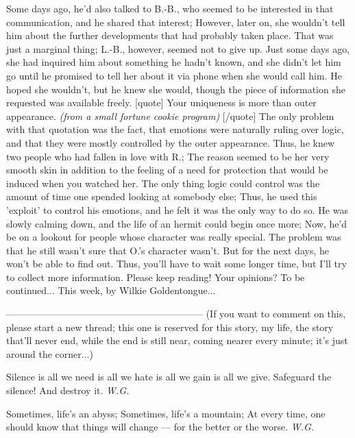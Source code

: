 Some days ago, he'd also talked to B.-B., who seemed to be interested in that communication, and he shared that interest; However, later on, she wouldn't tell him about the further developments that had probably taken place. 
That was just a marginal thing; L.-B., however, seemed not to give up. Just some days ago, she had inquired him about something he hadn't known, and she didn't let him go until he promised to tell her about it via phone when she would call him. He hoped she wouldn't, but he knew she would, though the piece of information she requested was available freely. 
[quote]
Your uniqueness is more than outer appearance. 
\emph{(from a small fortune cookie program)}
[/quote]
The only problem with that quotation was the fact, that emotions were naturally ruling over logic, and that they were mostly controlled by the outer appearance. Thus, he knew two people who had fallen in love with R.; The reason seemed to be her very smooth skin in addition to the feeling of a need for protection that would be induced when you watched her. 
The only thing logic could control was the amount of time one spended looking at somebody else; Thus, he used this 'exploit' to control his emotions, and he felt it was the only way to do so. 
He was slowly calming down, and the life of an hermit could begin once more; Now, he'd be on a lookout for people whose character was really special. 
The problem was that he still wasn't sure that O.'s character wasn't. 
But for the next days, he won't be able to find out. Thus, you'll have to wait some longer time, but I'll try to collect more information. 
Please keep reading!
Your opinions?
To be continued...
This week, by Wilkie Goldentongue...

--------------------------------------------------------------
(If you want to comment on this, please start a new thread; this one is reserved for this story, my life, the story that'll never end, while the end is still near, coming nearer every minute; it's just around the corner...)

Silence 
is all we need 
is all we hate 
is all we gain 
is all we give. 
Safeguard the silence! 
And destroy it. 
\emph{W.G.}

Sometimes, 
life's an abyss; 
Sometimes, 
life's a mountain; 
At every time, 
one should know 
that things will change --- 
for the better 
or the worse. 
\emph{W.G.}
